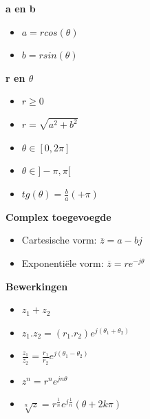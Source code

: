\documentclass[12pt]{report}
\newcommand{\important}[1] {\textbf{\color{orange}#1}}
\begin{document}
\important{a en b}
\begin{itemize}
 \item $a = rcos(\theta)$
 \item $b = rsin(\theta)$
\end{itemize}
\important{r en $\theta$}
\begin{itemize}
 \item $r \geq 0$
 \item $r = \sqrt{a^2 + b^2}$
 
 \item $\theta \in [0, 2\pi]$
 \item $\theta \in ]-\pi, \pi[$
 \item $tg(\theta) = \frac{b}{a} (+ \pi)$
\end{itemize}
\important{Complex toegevoegde}
\begin{itemize}
 \item Cartesische vorm: $\overline{z} = a - bj$ 
 \item Exponentiële vorm: $\overline{z} = re^{-j\theta}$
\end{itemize}
\important{Bewerkingen}
\begin{itemize}
 \item $z_1 + z_2$
 \item $z_1 . z_2 = (r_1 . r_2)e^{j(\theta_1 + \theta_2)}$
 \item $\frac{z_1}{z_2} = \frac{r_1}{r_2}e^{j(\theta_1 - \theta_2)}$
 \item $z^{n} = r^{n}e^{jn\theta}$
 \item $\sqrt[n]{z} = r^{\frac{1}{n}}e^{j\frac{1}{n}}(\theta + 2k\pi)$
\end{itemize}
\end{document}
